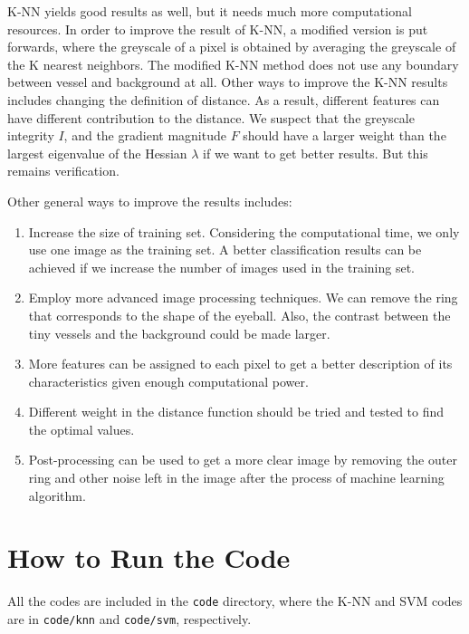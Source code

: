 \documentclass[12pt, notitlepage]{article}
\begin{document}
K-NN yields good results as well, but it needs much more computational resources. In order to improve the result of K-NN, a modified version is put forwards, where the greyscale of a pixel is obtained by averaging the greyscale of the K nearest neighbors. The modified K-NN method does not use any boundary between vessel and background at all.  Other ways to improve the K-NN results includes changing the definition of distance. As a result, different features can have different contribution to the distance. We suspect that the greyscale integrity $I$, and the gradient magnitude $F$ should have a larger weight than the largest eigenvalue of the Hessian $\lambda$ if we want to get better results. But this remains verification. 


Other general ways to improve the results includes:
\begin{enumerate}
\item Increase the size of training set. Considering the computational time, we only use one image as the training set. A better classification results can be achieved if we increase the number of images used in the training set. 
\item Employ more advanced image processing techniques.  We can remove the ring that corresponds to the shape of the eyeball.  Also, the contrast between the tiny vessels and the background could be made larger.  
\item  More features can be assigned to each pixel to get a better description of its characteristics given enough computational power.
\item Different weight in the distance function should be tried and tested to find the optimal values. 
\item Post-processing can be used to get a more clear image by removing the outer ring and other noise left in the image after the process of machine learning algorithm.
\end{enumerate}



\newpage
\appendix
\section{How to Run the Code}
\label{appendix:a}

All the codes are included in the \verb|code| directory, where the K-NN and SVM codes are in \verb|code/knn| and \verb|code/svm|, respectively. 
\end{document}
